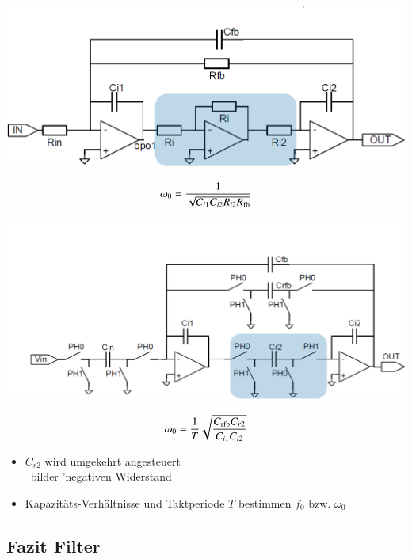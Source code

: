 \begin{minipage}[t]{0.48\columnwidth}
    \begin{center}
        \includegraphics[width=\columnwidth]{images/rc_filter.png}
    \end{center}
    $$ \omega_0 = \frac{1}{\sqrt{C_{i1} C_{i2} R_{i2} R_{\rm fb}}} $$
\end{minipage}
\hfill
\begin{minipage}[t]{0.48\columnwidth}
    \begin{center}
        \includegraphics[width=\columnwidth]{images/sc_filter.png}
    \end{center}

    $$ \omega_0 =  \frac{1}{T} \sqrt{ \frac{C_{\rm rfb} C_{r2}}{ C_{i1} C_{i2}} } $$

    \begin{itemize}
        \item $C_{r2}$ wird umgekehrt angesteuert \\
            \textrightarrow\ bilder 'negativen Widerstand
        \item Kapazitäts-Verhältnisse und Taktperiode $T$ bestimmen $f_0$ bzw. $\omega_0$
    \end{itemize}
\end{minipage}


\subsection{Fazit Filter}

